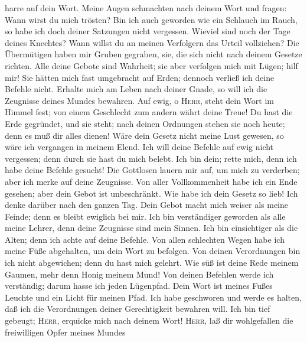 harre auf dein Wort.  Meine Augen schmachten nach deinem
Wort und fragen: Wann wirst du mich trösten?  Bin ich
auch geworden wie ein Schlauch im Rauch, so habe ich doch deiner
Satzungen nicht vergessen.  Wieviel sind noch der Tage
deines Knechtes? Wann willst du an meinen Verfolgern das Urteil
vollziehen?  Die Übermütigen haben mir Gruben gegraben,
sie, die sich nicht nach deinem Gesetze richten.  Alle
deine Gebote sind Wahrheit; sie aber verfolgen mich mit Lügen; hilf mir!
 Sie hätten mich fast umgebracht auf Erden; dennoch
verließ ich deine Befehle nicht.  Erhalte mich am Leben
nach deiner Gnade, so will ich die Zeugnisse deines Mundes bewahren.
 Auf ewig, o \textsc{Herr}, steht dein Wort im Himmel
fest;  von einem Geschlecht zum andern währt deine Treue!
Du hast die Erde gegründet, und sie steht;  nach deinen
Ordnungen stehen sie noch heute; denn es muß dir alles dienen!
 Wäre dein Gesetz nicht meine Lust gewesen, so wäre ich
vergangen in meinem Elend.  Ich will deine Befehle auf
ewig nicht vergessen; denn durch sie hast du mich belebt.
 Ich bin dein; rette mich, denn ich habe deine Befehle
gesucht!  Die Gottlosen lauern mir auf, um mich zu
verderben; aber ich merke auf deine Zeugnisse.  Von aller
Vollkommenheit habe ich ein Ende gesehen; aber dein Gebot ist
unbeschränkt.  Wie habe ich dein Gesetz so lieb! Ich
denke darüber nach den ganzen Tag.  Dein Gebot macht mich
weiser als meine Feinde; denn es bleibt ewiglich bei mir.
 Ich bin verständiger geworden als alle meine Lehrer,
denn deine Zeugnisse sind mein Sinnen.  Ich bin
einsichtiger als die Alten; denn ich achte auf deine Befehle.
 Von allen schlechten Wegen habe ich meine Füße
abgehalten, um dein Wort zu befolgen.  Von deinen
Verordnungen bin ich nicht abgewichen; denn du hast mich gelehrt.
 Wie süß ist deine Rede meinem Gaumen, mehr denn Honig
meinem Mund!  Von deinen Befehlen werde ich verständig;
darum hasse ich jeden Lügenpfad.  Dein Wort ist meines
Fußes Leuchte und ein Licht für meinen Pfad.  Ich habe
geschworen und werde es halten, daß ich die Verordnungen deiner
Gerechtigkeit bewahren will.  Ich bin tief gebeugt;
\textsc{Herr}, erquicke mich nach deinem Wort! 
\textsc{Herr}, laß dir wohlgefallen die freiwilligen Opfer meines Mundes
